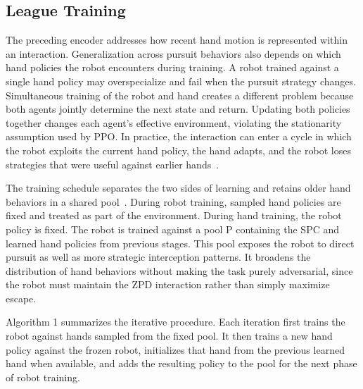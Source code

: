 \documentclass[journal,twoside,web]{ieeecolor2}
\begin{document}
\subsection{League Training}
The preceding encoder addresses how recent hand motion is represented within an interaction. Generalization across pursuit behaviors also depends on which hand policies the robot encounters during training. A robot trained against a single hand policy may overspecialize and fail when the pursuit strategy changes. Simultaneous training of the robot and hand creates a different problem because both agents jointly determine the next state and return. Updating both policies together changes each agent's effective environment, violating the stationarity assumption used by PPO. In practice, the interaction can enter a cycle in which the robot exploits the current hand policy, the hand adapts, and the robot loses strategies that were useful against earlier hands~\cite{b44}.

The training schedule separates the two sides of learning and retains older hand behaviors in a shared pool~\cite{b45,b46}. During robot training, sampled hand policies are fixed and treated as part of the environment. During hand training, the robot policy is fixed. The robot is trained against a pool P containing the SPC and learned hand policies from previous stages. This pool exposes the robot to direct pursuit as well as more strategic interception patterns. It broadens the distribution of hand behaviors without making the task purely adversarial, since the robot must maintain the ZPD interaction rather than simply maximize escape.

Algorithm 1 summarizes the iterative procedure. Each iteration first trains the robot against hands sampled from the fixed pool. It then trains a new hand policy against the frozen robot, initializes that hand from the previous learned hand when available, and adds the resulting policy to the pool for the next phase of robot training.
\end{document}
